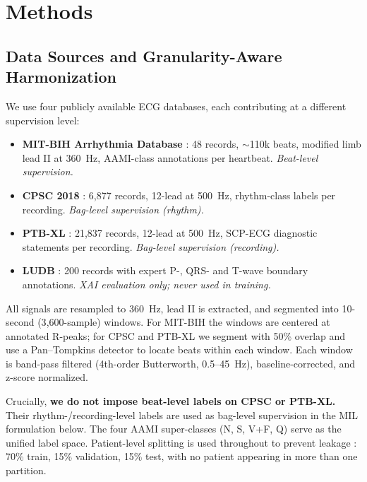 \documentclass[conference]{IEEEtran}
\begin{document}
\section{Methods}

\subsection{Data Sources and Granularity-Aware Harmonization}

We use four publicly available ECG databases, each contributing at a different supervision level:

\begin{itemize}
\item \textbf{MIT-BIH Arrhythmia Database} \cite{mitbih2001}: 48 records, $\sim$110k beats, modified limb lead II at 360~Hz, AAMI-class annotations per heartbeat. \textit{Beat-level supervision.}
\item \textbf{CPSC 2018} \cite{cpsc2018}: 6{,}877 records, 12-lead at 500~Hz, rhythm-class labels per recording. \textit{Bag-level supervision (rhythm).}
\item \textbf{PTB-XL} \cite{ptbxl2020}: 21{,}837 records, 12-lead at 500~Hz, SCP-ECG diagnostic statements per recording. \textit{Bag-level supervision (recording).}
\item \textbf{LUDB} \cite{ludb2020}: 200 records with expert P-, QRS- and T-wave boundary annotations. \textit{XAI evaluation only; never used in training.}
\end{itemize}

All signals are resampled to 360~Hz, lead II is extracted, and segmented into 10-second (3{,}600-sample) windows. For MIT-BIH the windows are centered at annotated R-peaks; for CPSC and PTB-XL we segment with 50\% overlap and use a Pan--Tompkins detector to locate beats within each window. Each window is band-pass filtered (4th-order Butterworth, 0.5--45~Hz), baseline-corrected, and z-score normalized.

Crucially, \textbf{we do not impose beat-level labels on CPSC or PTB-XL.} Their rhythm-/recording-level labels are used as bag-level supervision in the MIL formulation below. The four AAMI super-classes (N, S, V+F, Q) \cite{aami2012} serve as the unified label space. Patient-level splitting is used throughout to prevent leakage \cite{dechazal2004}: 70\% train, 15\% validation, 15\% test, with no patient appearing in more than one partition.
\end{document}
